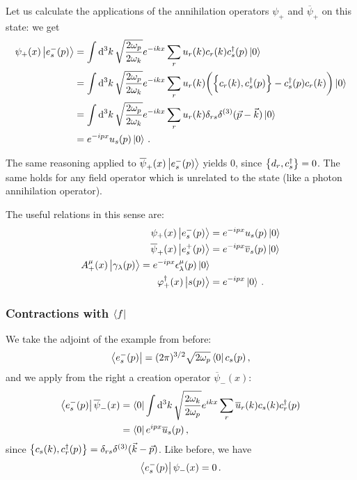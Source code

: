 \documentclass[main.tex]{subfiles}
\begin{document}
Let us calculate the applications 
of the annihilation operators \(\psi_{+}\) and \(\overline{\psi}_{+}\) on this state: we get 
%
\begin{align}
\psi_{+} (x) \ket{e^{-}_{s} (p)}
&= \int \dd[3]{k} \sqrt{\frac{2 \omega_{p}}{2 \omega_{k}}}
e^{-ikx} \sum_{r} u_r (k) c_r (k) c_s ^\dag (p) \ket{0}  \\
&= \int \dd[3]{k} \sqrt{\frac{2 \omega_{p}}{2 \omega_{k}}}
e^{-ikx} \sum_{r} u_r (k) \qty(\qty{ c_r (k), c_s ^\dag (p)} - c_s ^\dag (p) c_r (k)) \ket{0}  \\
&= \int \dd[3]{k} \sqrt{\frac{2 \omega_{p}}{2 \omega_{k}}}
e^{-ikx} \sum_{r} u_r (k) \delta_{rs} \delta^{(3)}(\vec{p} - \vec{k}) \ket{0}  \\
&= e^{-ipx} u_s (p) \ket{0}
\,.
\end{align}

The same reasoning applied to \(\overline{\psi}_{+}(x) \ket{e^{-}_{s}(p)}\) yields 0, since \(\qty{d_r, c_s ^\dag }= 0\). 
The same holds for any field operator which is unrelated to the state (like a photon annihilation operator). 

The useful relations in this sense are: 
%
\begin{align}
\psi_{+} (x) \ket{e^{-}_{s} (p)} &= e^{-ipx} u_s (p) \ket{0} \\
\overline{\psi}_{+} (x) \ket{e^{+}_{s} (p)} &= e^{-ipx} \overline{v}_s (p) \ket{0}  \\
A^{\mu }_{+} (x) \ket{\gamma_{\lambda } (p)} =e^{-ipx} \epsilon^{\mu }_{\lambda } (p)\ket{0}  \\
\varphi ^\dag_{+} (x) \ket{s(p)} &= e^{-ipx} \ket{0} 
\,.
\end{align}

\subsubsection{Contractions with \(\bra{f}\)}

We take the adjoint of the example from before: 
%
\begin{align}
\bra{e^{-}_{s} (p)} = (2 \pi)^{3/2} \sqrt{2 \omega_{p}}
\bra{0} c_s (p)
\,,
\end{align}
%
and we apply from the right a creation operator \(\overline{\psi}_{-}(x)\): 
%
\begin{align}
\bra{e^{-}_{s}(p)}
\overline{\psi}_{-}(x)
&= \bra{0} \int \dd[3]{k}
\sqrt{ \frac{2 \omega_{k}}{2 \omega_{p}}}
e^{ikx} \sum _{r} \overline{u}_{r} (k) c_s (k) c_r ^\dag (p)  \\
&= \bra{0} e^{ipx} \overline{u}_{s} (p)
\,,
\end{align}
%
since \(\qty{c_s (k), c_r ^\dag (p)} = \delta_{rs} \delta^{(3)}(\vec{k} - \vec{p})\). Like before, we have 
%
\begin{align}
\bra{e^{-}_{s}(p)} \psi_{-} (x) = 0
\,.
\end{align}
\end{document}
